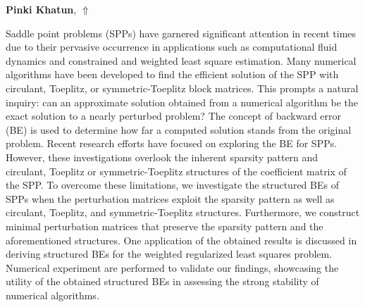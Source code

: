 \documentclass[ILAS2025-program.tex]{subfiles}
\begin{document}
\hypertarget{down0098}{}\begin{ilasabstract}
    
\textbf{Pinki Khatun},  \hfill \hyperlink{up0098}{$\Uparrow$}
    
    
\mtskip
    Saddle point problems (SPPs) have garnered significant attention in recent times due to their pervasive occurrence in applications such as computational fluid dynamics and constrained and weighted least square estimation. Many numerical algorithms have been developed to find the efficient solution of the {SPP}  with {{circulant}}, {Toeplitz}, or {symmetric}-{Toeplitz} block matrices. This prompts a natural inquiry: can an approximate solution obtained from a numerical algorithm be the exact solution to a nearly perturbed problem? The concept of backward error ({BE})  is used to determine how far a computed solution stands from the original problem. Recent research efforts have focused on exploring the  BE for SPPs. However, these investigations overlook the inherent sparsity pattern and {{circulant}},  {Toeplitz} or symmetric-Toeplitz structures of the coefficient matrix of the SPP. To overcome these limitations, we investigate the structured  {BEs} of {SPPs} when the perturbation matrices exploit the sparsity pattern as well as { {circulant}},  {Toeplitz}, and  {symmetric}-{Toeplitz} structures. Furthermore, we construct minimal perturbation matrices that preserve the sparsity pattern and the aforementioned structures. One application of the obtained results is discussed in deriving structured  {BEs} for the weighted regularized least squares problem. Numerical experiment are performed to validate our findings, showcasing the utility of the obtained structured  {BEs} in assessing the strong stability of numerical algorithms.
\end{ilasabstract}
    
\end{document}
